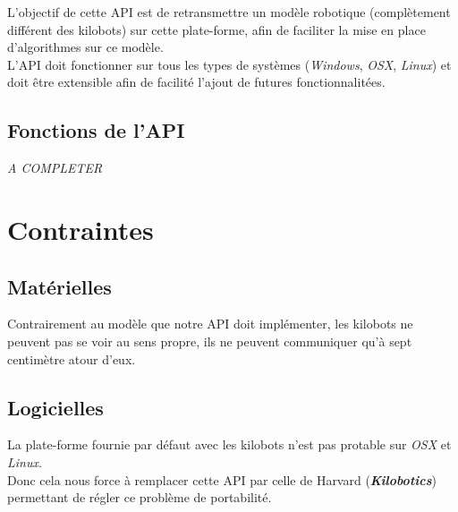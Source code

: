 \documentclass[a4paper,8pt]{report}
\begin{document}
\smallskip
L'objectif de cette API est de retransmettre un mod\`ele robotique (compl\`etement diff\'erent des kilobots) sur cette plate-forme, afin de faciliter la mise en place d'algorithmes sur ce mod\`ele.\\

\smallskip
L'API doit fonctionner sur tous les types de syst\`emes (\textit{Windows}, \textit{OSX}, \textit{Linux}) et doit \^etre extensible afin de facilit\'e l'ajout de futures fonctionnalit\'ees.\\

\section*{Fonctions de l'API}\label{sec:name}

\textit{A COMPLETER}

\chapter{Contraintes}

\section*{Mat\'erielles}\label{sec:name}

Contrairement au mod\`ele que notre API doit impl\'ementer, les kilobots ne peuvent pas se voir au sens propre, ils ne peuvent communiquer qu'\`a sept centim\`etre atour d'eux.

\section*{Logicielles}\label{sec:name}

La plate-forme fournie par d\'efaut avec les kilobots n'est pas protable sur \textit{OSX} et \textit{Linux}.\\
Donc cela nous force \`a remplacer cette API par celle de Harvard (\textit{\textbf{Kilobotics}}) permettant de r\'egler ce probl\`eme de portabilit\'e.
\end{document}
